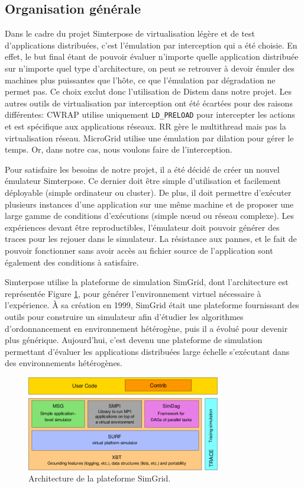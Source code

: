 \subsection{Organisation générale}

Dans le cadre du projet Simterpose de virtualisation légère et de test
d'applications distribuées, c'est l'émulation par interception qui a été
choisie. En effet, le but final étant de pouvoir évaluer n'importe quelle
application distribuée sur n'importe quel type d'architecture, on peut se
retrouver à devoir émuler des machines plus puissantes que l'hôte, ce que
l'émulation par dégradation ne permet pas. Ce choix exclut donc l'utilisation de
Distem dans notre projet. Les autres outils de virtualisation par interception
ont été écartées pour des raisons différentes: CWRAP utilise uniquement
\texttt{LD\_PRELOAD} pour intercepter les actions et est spécifique aux
applications réseaux. RR gère le multithread mais pas la virtualisation réseau. MicroGrid utilise une émulation par dilation pour gérer le temps. Or, dans notre cas, nous voulons faire de l'interception.

Pour satisfaire les besoins de notre projet, il a été décidé de créer un nouvel
émulateur Simterpose. Ce dernier doit être simple d'utilisation et facilement
déployable (simple ordinateur ou cluster).  De plus, il doit permettre
d'exécuter plusieurs instances d'une application sur une même machine et de proposer une large gamme de conditions d'exécutions (simple n\oe ud ou réseau
complexe). Les expériences devant être reproductibles, l'émulateur doit pouvoir
générer des traces pour les rejouer dans le simulateur. La résistance aux
pannes, et le fait de pouvoir fonctionner sans avoir accès au fichier source de
l'application sont également des conditions à satisfaire.

Simterpose utilise la plateforme de simulation SimGrid, dont l'architecture
est représentée Figure \ref{SimGrid}, pour générer l'environnement virtuel
nécessaire à l'expérience. À sa création en 1999, SimGrid
\citep{CASANOVA:SimGrid} était une plateforme fournissant des outils pour
construire un simulateur afin d'étudier les algorithmes d'ordonnancement en
environnement hétérogène, puis il a évolué \citep{MARTIN:SimGrid} pour devenir
plus générique. Aujourd'hui, c'est devenu une plateforme de simulation
permettant d'évaluer les applications distribuées large échelle s'exécutant dans
des environnements hétérogènes.
 
\begin{figure}[H]
  \centering
  \includegraphics{Pictures/png/SimGrid}
  \caption{Architecture de la plateforme SimGrid.}
  \label{SimGrid}
\end{figure}

